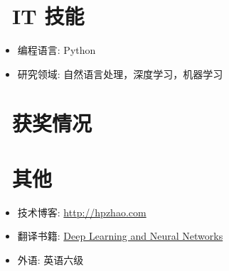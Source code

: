 \documentclass{resume}
\begin{document}
\section{\faCogs\ IT 技能}
\begin{itemize}[parsep=0.5ex]
  \item 编程语言: Python
  \item 研究领域: 自然语言处理，深度学习，机器学习
  
\end{itemize}

\section{\faHeartO\ 获奖情况}

\section{\faInfo\ 其他}
\begin{itemize}[parsep=0.5ex]
  \item 技术博客: \href{http://hpzhao.com}{http://hpzhao.com}
  \item 翻译书籍: \href{http://hpzhao.com/2016/07/10/%E3%80%90%E8%AF%91%E3%80%91%E7%A5%9E%E7%BB%8F%E7%BD%91%E7%BB%9C%E4%B8%8E%E6%B7%B1%E5%BA%A6%E5%AD%A6%E4%B9%A0/}{Deep Learning and Neural Networks}
  \item 外语: 英语六级
\end{itemize}
\end{document}
